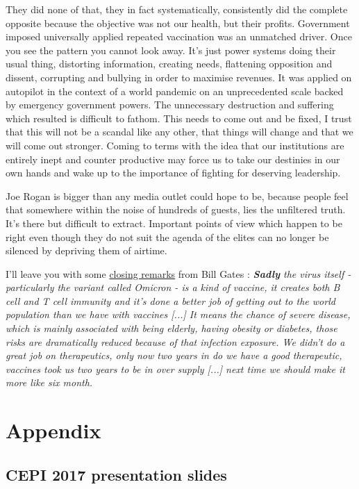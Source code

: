 \documentclass[11pt,a4paper,notitlepage]{report}
\begin{document}
They did none of that, they in fact systematically, consistently did the complete opposite because the objective was not our health, but their profits. Government imposed universally applied repeated vaccination was an unmatched driver. Once you see the pattern you cannot look away. It's just power systems doing their usual thing, distorting information, creating needs, flattening opposition and dissent, corrupting and bullying in order to maximise revenues. It was applied on autopilot in the context of a world pandemic on an unprecedented scale backed by emergency government powers. The unnecessary destruction and suffering which resulted is difficult to fathom. This needs to come out and be fixed, I trust that this will not be a scandal like any other, that things will change and that we will come out stronger. Coming to terms with the idea that our institutions are entirely inept and counter productive may force us to take our destinies in our own hands and wake up to the importance of fighting for deserving leadership.

Joe Rogan is bigger than any media outlet could hope to be, because people feel that somewhere within the noise of hundreds of guests, lies the unfiltered truth. It's there but difficult to extract. Important points of view which happen to be right even though they do not suit the agenda of the elites can no longer be silenced by depriving them of airtime. 

I'll leave you with some \href{https://twitter.com/disclosetv/status/1494810193175195652}{closing remarks} from Bill Gates \cite{twitter19022022}: \textit{\textbf{Sadly} the virus itself - particularly the variant called Omicron - is a kind of vaccine, it creates both B cell and T cell immunity and it's done a better job of getting out to the world population than we have with vaccines [...] It means the chance of severe disease, which is mainly associated with being elderly, having obesity or diabetes, those risks are dramatically reduced because of that infection exposure. We didn't do a great job on therapeutics, only now two years in do we have a good therapeutic, vaccines took us two years to be in over supply [...] next time we should make it more like six month.}

\clearpage

\section*{Appendix}

\subsection*{CEPI 2017 presentation slides}
\end{document}
